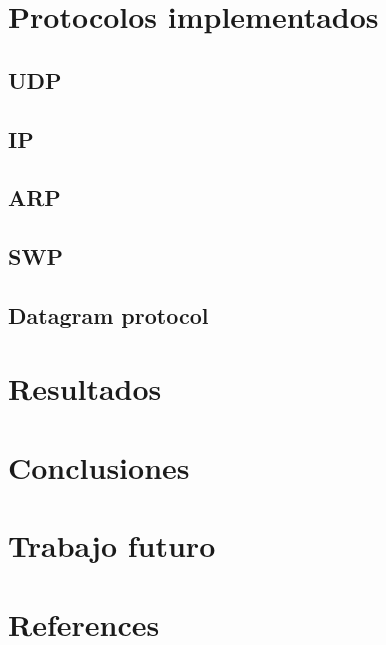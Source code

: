\documentclass[10pt,a4paper]{article}
\begin{document}
\section{Protocolos implementados}
\subsection{UDP}
\subsection{IP}
\subsection{ARP}
\subsection{SWP}
\subsection{Datagram protocol}
\section{Resultados}
\section{Conclusiones}
\section{Trabajo futuro}
\section{References}


\end{document}
